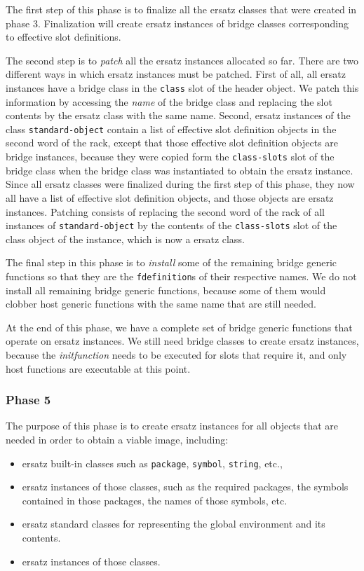 The first step of this phase is to finalize all the ersatz classes
that were created in phase 3.  Finalization will create ersatz
instances of bridge classes corresponding to effective slot
definitions. 

The second step is to \emph{patch} all the ersatz instances allocated
so far.  There are two different ways in which ersatz instances must
be patched.  First of all, all ersatz instances have a bridge class in
the \texttt{class} slot of the header object.  We patch this
information by accessing the \emph{name} of the bridge class and
replacing the slot contents by the ersatz class with the same name.
Second, ersatz instances of the class \texttt{standard-object} contain
a list of effective slot definition objects in the second word of the
rack, except that those effective slot definition objects
are bridge instances, because they were copied form the
\texttt{class-slots} slot of the bridge class when the bridge class
was instantiated to obtain the ersatz instance.  Since all ersatz
classes were finalized during the first step of this phase, they now
all have a list of effective slot definition objects, and those
objects are ersatz instances.  Patching consists of replacing the
second word of the rack of all instances of
\texttt{standard-object} by the contents of the \texttt{class-slots}
slot of the class object of the instance, which is now a ersatz
class. 

The final step in this phase is to \emph{install} some of the
remaining bridge generic functions so that they are the
\texttt{fdefinition}s of their respective names.  We do not install
all remaining bridge generic functions, because some of them would
clobber host generic functions with the same name that are still
needed.  

At the end of this phase, we have a complete set of bridge generic
functions that operate on ersatz instances.  We still need bridge
classes to create ersatz instances, because the \emph{initfunction}
needs to be executed for slots that require it, and only host
functions are executable at this point.

\subsubsection{Phase 5}

The purpose of this phase is to create ersatz instances for all
objects that are needed in order to obtain a viable image, including: 

\begin{itemize}
\item ersatz built-in classes such as \texttt{package}, \texttt{symbol},
  \texttt{string}, etc., 
\item ersatz instances of those classes, such as the required
  packages, the symbols contained in those packages, the names of
  those symbols, etc.
\item ersatz standard classes for representing the global environment
  and its contents.
\item ersatz instances of those classes.
\end{itemize}


